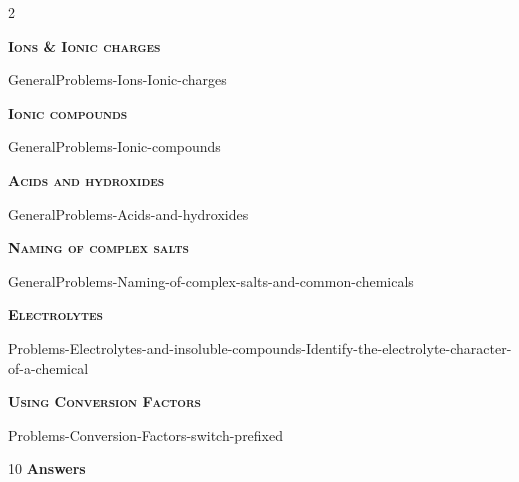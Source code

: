\documentclass[main.tex]{subfiles}
\begin{document}
\begin{multicols*}{2}
{\raggedright\textsc{\textbf{Ions \& Ionic charges}}\par}
{GeneralProblems-Ions-Ionic-charges}

 

{\raggedright\textsc{\textbf{Ionic compounds}}\par}
 {GeneralProblems-Ionic-compounds}

{\raggedright\textsc{\textbf{Acids and hydroxides}}\par}
{GeneralProblems-Acids-and-hydroxides}
{\raggedright\textsc{\textbf{Naming of complex salts }}\par}
{GeneralProblems-Naming-of-complex-salts-and-common-chemicals}


{\raggedright\textsc{\textbf{Electrolytes}}\par}
{Problems-Electrolytes-and-insoluble-compounds-Identify-the-electrolyte-character-of-a-chemical}


{\raggedright\textsc{\textbf{Using Conversion Factors }}\par}
{Problems-Conversion-Factors-switch-prefixed}

 
 

\end{multicols*}
\newpage
\begin{answersenvironment}
\begin{minipage}[c]{1\textwidth}
\begin{localsize}{10}
{\Large \bf Answers}
\end{localsize}
\end{minipage}\end{answersenvironment}
\end{document}
